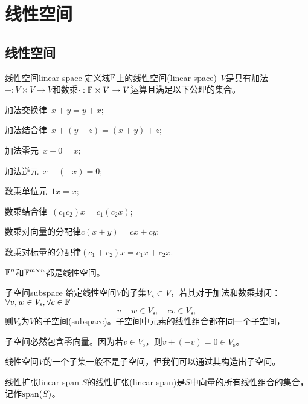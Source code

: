 \chapter{线性空间}
\section{线性空间}
\begin{definition}{线性空间}{linear space}
	定义域$\mathbb F$上的线性空间(linear space)~$V$是具有加法$+:V\times V\to V$和数乘$\cdot:\mathbb F\times V\to V$运算且满足以下公理的集合。
	\begin{compactenum}
		\item 加法交换律\qqqquad\quad~$x+y=y+x;$
		\item 加法结合律\qqqquad\quad~$x+(y+z)=(x+y)+z;$
		\item 加法零元\qqqquad\qquad~$x+0=x;$
		\item 加法逆元\qqqquad\qquad~$x+(-x)=0;$
		\item 数乘单位元\qqqquad\quad~$1x=x;$
		\item 数乘结合律\qqqquad\quad~$(c_1c_2)x=c_1(c_2x);$
		\item 数乘对向量的分配律\quad$c(x+y)=cx+cy;$
		\item 数乘对标量的分配律\quad$(c_1+c_2)x=c_1x+c_2x.$
	\end{compactenum}
\end{definition}

\begin{example}
	{}{}
	$\mathbb F^n$和$\mathbb F^{m\times n}$都是线性空间。
\end{example}

\begin{definition}{子空间}{subspace}
	给定线性空间$V$的子集$V_\mathrm s\subset V$，若其对于加法和数乘封闭：$\forall v,w\in V_\mathrm s,\forall c\in\mathbb F$
	\[
		v+w\in V_\mathrm s,\quad cv\in V_\mathrm s,
	\]
	则$V_\mathrm s$为$V$的子空间(subspace)。子空间中元素的线性组合都在同一个子空间，
\end{definition}

\begin{corollary}
	子空间必然包含零向量。因为若$v\in V_\mathrm s$，则$v+(-v)=0\in V_\mathrm s$。
\end{corollary}

\begin{remark}
	线性空间$V$的一个子集一般不是子空间，但我们可以通过其构造出子空间。
\end{remark}

\begin{definition}{线性扩张}{linear span}
	$S$的线性扩张(linear span)是$S$中向量的所有线性组合的集合，记作$\operatorname{span}(S)$。
\end{definition}

